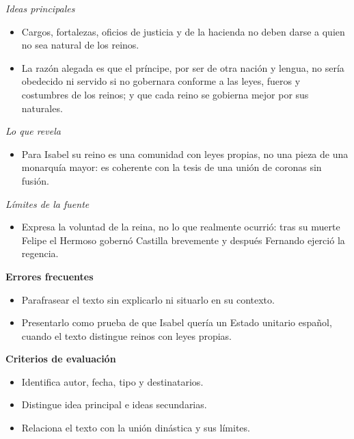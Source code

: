 \documentclass{book}
\begin{document}
\begin{tcolorbox}[title={Ejercicio resuelto}, studiumworked, breakable]
\noindent\textit{Ideas principales}
\begin{itemize}
\item Cargos, fortalezas, oficios de justicia y de la hacienda no deben darse a quien no sea natural de los reinos.
\item La razón alegada es que el príncipe, por ser de otra nación y lengua, no sería obedecido ni servido si no gobernara conforme a las leyes, fueros y costumbres de los reinos; y que cada reino se gobierna mejor por sus naturales.
\end{itemize}

\noindent\textit{Lo que revela}
\begin{itemize}
\item Para Isabel su reino es una comunidad con leyes propias, no una pieza de una monarquía mayor: es coherente con la tesis de una unión de coronas sin fusión.
\end{itemize}

\noindent\textit{Límites de la fuente}
\begin{itemize}
\item Expresa la voluntad de la reina, no lo que realmente ocurrió: tras su muerte Felipe el Hermoso gobernó Castilla brevemente y después Fernando ejerció la regencia.
\end{itemize}

\noindent\textbf{Errores frecuentes}
\begin{itemize}
\item Parafrasear el texto sin explicarlo ni situarlo en su contexto.
\item Presentarlo como prueba de que Isabel quería un Estado unitario español, cuando el texto distingue reinos con leyes propias.
\end{itemize}

\noindent\textbf{Criterios de evaluación}
\begin{itemize}
\item Identifica autor, fecha, tipo y destinatarios.
\item Distingue idea principal e ideas secundarias.
\item Relaciona el texto con la unión dinástica y sus límites.
\end{itemize}
\end{tcolorbox}
\end{document}
